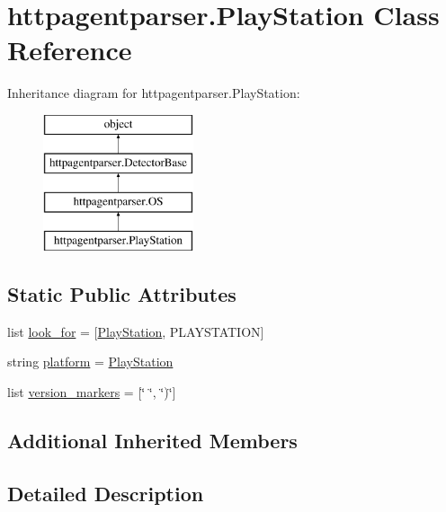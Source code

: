 \hypertarget{classhttpagentparser_1_1_play_station}{}\section{httpagentparser.\+Play\+Station Class Reference}
\label{classhttpagentparser_1_1_play_station}
Inheritance diagram for httpagentparser.\+Play\+Station\+:\begin{figure}[H]
\begin{center}
\leavevmode
\includegraphics[height=4.000000cm]{classhttpagentparser_1_1_play_station}
\end{center}
\end{figure}
\subsection*{Static Public Attributes}
\begin{DoxyCompactItemize}
\item 
list \hyperlink{classhttpagentparser_1_1_play_station_a9bed93563ec0e1ca015ce455feaa36f9}{look\+\_\+for} = \mbox{[}\textquotesingle{}\hyperlink{classhttpagentparser_1_1_play_station}{Play\+Station}\textquotesingle{}, \textquotesingle{}P\+L\+A\+Y\+S\+T\+A\+T\+I\+ON\textquotesingle{}\mbox{]}
\item 
string \hyperlink{classhttpagentparser_1_1_play_station_a104399d4c58b0e4d1ea73571a5e5de61}{platform} = \textquotesingle{}\hyperlink{classhttpagentparser_1_1_play_station}{Play\+Station}\textquotesingle{}
\item 
list \hyperlink{classhttpagentparser_1_1_play_station_a2c0c6a41410099bf643997f46605d4d8}{version\+\_\+markers} = \mbox{[}\char`\"{} \char`\"{}, \char`\"{})\char`\"{}\mbox{]}
\end{DoxyCompactItemize}
\subsection*{Additional Inherited Members}


\subsection{Detailed Description}


